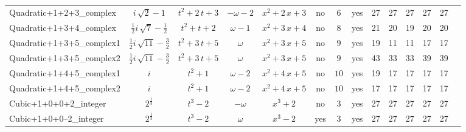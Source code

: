 \begin{tabular}{l|c c| c cc|cc|c c  c  c  c  c  }
Quadratic+1+2+3\_complex & $ i \, \sqrt{2} - 1 $ & $ t^{2} + 2 \, t + 3 $ & $ -\omega - 2 $ & $ x^{2} + 2 \, x + 3 $ & no & $ 6 $ & yes & 27 & 27 & 27 & 27 & 27 \\
Quadratic+1+3+4\_complex & $ \frac{1}{2} i \, \sqrt{7} - \frac{1}{2} $ & $ t^{2} + t + 2 $ & $ \omega - 1 $ & $ x^{2} + 3 \, x + 4 $ & no & $ 8 $ & yes & 21 & 20 & 19 & 20 & 20 \\
Quadratic+1+3+5\_complex1 & $ \frac{1}{2} i \, \sqrt{11} - \frac{3}{2} $ & $ t^{2} + 3 \, t + 5 $ & $ \omega $ & $ x^{2} + 3 \, x + 5 $ & no & $ 9 $ & yes & 19 & 11 & 11 & 17 & 17 \\
Quadratic+1+3+5\_complex2  & $ \frac{1}{2} i \, \sqrt{11} - \frac{3}{2} $ & $ t^{2} + 3 \, t + 5 $ & $ \omega $ & $ x^{2} + 3 \, x + 5 $ & no & $ 9 $ & yes & 43 & 33 & 33 & 39 & 39 \\
Quadratic+1+4+5\_complex1 & $ i $ & $ t^{2} + 1 $ & $ \omega - 2 $ & $ x^{2} + 4 \, x + 5 $ & no & $ 10 $ & yes & 19 & 17 & 17 & 17 & 17 \\
Quadratic+1+4+5\_complex2 & $ i $ & $ t^{2} + 1 $ & $ \omega - 2 $ & $ x^{2} + 4 \, x + 5 $ & no & $ 10 $ & yes & 17 & 17 & 17 & 17 & 17 \\
Cubic+1+0+0+2\_integer & $ 2^{\frac{1}{3}} $ & $ t^{3} - 2 $ & $ -\omega $ & $ x^{3} + 2 $ & no & $ 3 $ & yes & 27 & 27 & 27 & 27 & 27 \\
Cubic+1+0+0--2\_integer & $ 2^{\frac{1}{3}} $ & $ t^{3} - 2 $ & $ \omega $ & $ x^{3} - 2 $ & yes & $ 3 $ & yes & 27 & 27 & 27 & 27 & 27 \\
\end{tabular}
